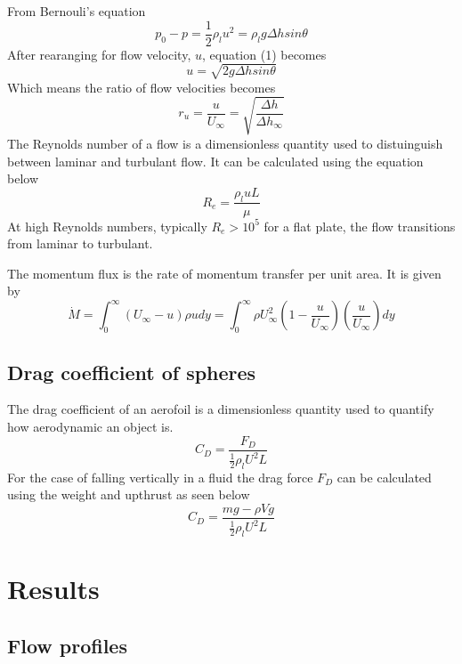 \documentclass{article}
\begin{document}
From Bernouli's equation
\begin{equation}
    p_0 - p = \frac{1}{2}\rho_l u^2 = \rho_l g \Delta h sin \theta
\end{equation}
After rearanging for flow velocity, $u$, equation (1) becomes
\begin{equation}
    u = \sqrt{2 g \Delta h sin \theta}
\end{equation}
Which means the ratio of flow velocities becomes
\begin{equation}
    r_u = \frac{u}{U_\infty} = \sqrt{\frac{\Delta h}{\Delta h_\infty}}
\end{equation}
The Reynolds number of a flow is a dimensionless quantity used to distuinguish between laminar and turbulant flow.
It can be calculated using the equation below
\begin{equation}
    R_e = \frac{\rho_l u L}{\mu}
\end{equation}
At high Reynolds numbers, typically $R_e > 10^5$ for a flat plate, the flow transitions from laminar to turbulant.

The momentum flux is the rate of momentum transfer per unit area. It is given by
\begin{equation}
    \dot{M} = \int_0^\infty (U_{\infty} - u) \rho u dy = \int_0^\infty \rho U_{\infty}^2 \left( 1 - \frac{u}{U_{\infty}} \right) \left( \frac{u}{U_{\infty}} \right) dy
\end{equation}

\subsection{Drag coefficient of spheres}

The drag coefficient of an aerofoil is a dimensionless quantity used to quantify how aerodynamic an object is.
\begin{equation}
    C_D = \frac{F_D}{\frac{1}{2}\rho_l U^2 L}
\end{equation}
For the case of falling vertically in a fluid the drag force $F_D$ can be calculated using the weight and upthrust as seen below
\begin{equation}
    C_D = \frac{mg - \rho V g}{\frac{1}{2}\rho_l U^2 L}
\end{equation}

\section{Results}


\subsection{Flow profiles}
\end{document}
